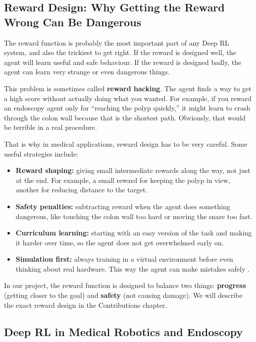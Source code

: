 \subsection{Reward Design: Why Getting the Reward Wrong Can Be Dangerous}

The reward function is probably the most important part of any Deep RL system, and also the trickiest to get right. If the reward is designed well, the agent will learn useful and safe behaviour. If the reward is designed badly, the agent can learn very strange or even dangerous things.

This problem is sometimes called \textbf{reward hacking}. The agent finds a way to get a high score without actually doing what you wanted. For example, if you reward an endoscopy agent only for ``reaching the polyp quickly,'' it might learn to crash through the colon wall because that is the shortest path. Obviously, that would be terrible in a real procedure.

That is why in medical applications, reward design has to be very careful. Some useful strategies include:

\begin{itemize}
\item \textbf{Reward shaping:} giving small intermediate rewards along the way, not just at the end. For example, a small reward for keeping the polyp in view, another for reducing distance to the target.
\item \textbf{Safety penalties:} subtracting reward when the agent does something dangerous, like touching the colon wall too hard or moving the snare too fast.
\item \textbf{Curriculum learning:} starting with an easy version of the task and making it harder over time, so the agent does not get overwhelmed early on.
\item \textbf{Simulation first:} always training in a virtual environment before even thinking about real hardware. This way the agent can make mistakes safely \cite{sutton2018reinforcement}.
\end{itemize}


In our project, the reward function is designed to balance two things: \textbf{progress} (getting closer to the goal) and \textbf{safety} (not causing damage). We will describe the exact reward design in the Contributions chapter.

\subsection{Deep RL in Medical Robotics and Endoscopy}

